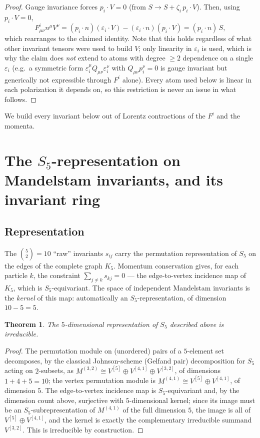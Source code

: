 \documentclass[reqno]{amsart}
\newtheorem{theorem}{Theorem}[section]
\begin{document}
\begin{proof}
Gauge invariance forces $p_i\cdot V=0$ (from $S\to S+\zeta_i\,p_i\cdot V$). Then, using $p_i\cdot
V=0$,
\[
F^i_{\mu\nu}n^\mu V^\nu = (p_i\cdot n)(\varepsilon_i\cdot V) - (\varepsilon_i\cdot n)(p_i\cdot V)
= (p_i\cdot n)\,S,
\]
which rearranges to the claimed identity. Note that this holds regardless of what other invariant
tensors were used to build $V$; only linearity in $\varepsilon_i$ is used, which is why the claim
does \emph{not} extend to atoms with degree $\geq2$ dependence on a single $\varepsilon_i$ (e.g.\ a
symmetric form $\varepsilon_i^\mu Q_{\mu\nu}\varepsilon_i^\nu$ with $Q_{\mu\nu}p_i^\nu=0$ is gauge
invariant but generically not expressible through $F^i$ alone). Every atom used below is linear in
each polarization it depends on, so this restriction is never an issue in what follows.
\end{proof}

We build every invariant below out of Lorentz contractions of the $F^i$ and the momenta.

\section{The \texorpdfstring{$S_5$}{S5}-representation on Mandelstam invariants, and its
invariant ring}
\label{sec:rep}

\subsection{Representation}

The $\binom{5}{2}=10$ ``raw'' invariants $s_{ij}$ carry the permutation representation of $S_5$ on
the edges of the complete graph $K_5$. Momentum conservation gives, for each particle $k$, the
constraint $\sum_{j\neq k}s_{kj}=0$ --- the edge-to-vertex incidence map of $K_5$, which is
$S_5$-equivariant. The space of independent Mandelstam invariants is the \emph{kernel} of this
map: automatically an $S_5$-representation, of dimension $10-5=5$.

\begin{theorem}
\label{thm:irrep}
The $5$-dimensional representation of $S_5$ described above is irreducible.
\end{theorem}

\begin{proof}
The permutation module on (unordered) pairs of a $5$-element set decomposes, by the classical
Johnson-scheme (Gelfand pair) decomposition for $S_5$ acting on $2$-subsets, as
$M^{(3,2)}\cong V^{[5]}\oplus V^{[4,1]}\oplus V^{[3,2]}$, of dimensions $1+4+5=10$; the vertex
permutation module is $M^{(4,1)}\cong V^{[5]}\oplus V^{[4,1]}$, of dimension $5$. The
edge-to-vertex incidence map is $S_5$-equivariant and, by the dimension count above, surjective
with $5$-dimensional kernel; since its image must be an $S_5$-subrepresentation of $M^{(4,1)}$ of
the full dimension $5$, the image is all of $V^{[5]}\oplus V^{[4,1]}$, and the kernel is exactly
the complementary irreducible summand $V^{[3,2]}$. This is irreducible by construction.
\end{proof}
\end{document}
